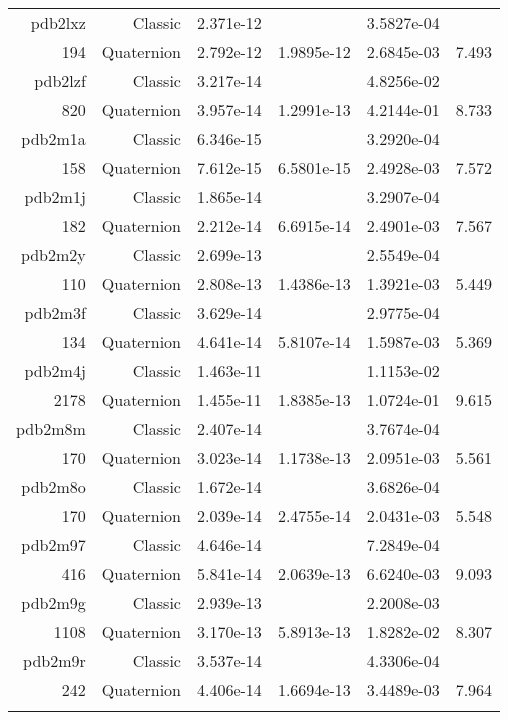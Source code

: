 \begin{xltabular}{\textwidth}{r|rS[table-format=1.3e+2]S[table-format=1.4e+2]S[table-format=1.4e+2]S[table-format=-1.3]}
pdb2lxz & Classic & 2.371e-12 &  & 3.5827e-04 & \\
194 & Quaternion & 2.792e-12 & 1.9895e-12 & 2.6845e-03 & 7.493\\  \addlinespace
pdb2lzf & Classic & 3.217e-14 &  & 4.8256e-02 & \\
820 & Quaternion & 3.957e-14 & 1.2991e-13 & 4.2144e-01 & 8.733\\  \addlinespace
pdb2m1a & Classic & 6.346e-15 &  & 3.2920e-04 & \\
158 & Quaternion & 7.612e-15 & 6.5801e-15 & 2.4928e-03 & 7.572\\  \addlinespace
pdb2m1j & Classic & 1.865e-14 &  & 3.2907e-04 & \\
182 & Quaternion & 2.212e-14 & 6.6915e-14 & 2.4901e-03 & 7.567\\  \addlinespace
pdb2m2y & Classic & 2.699e-13 &  & 2.5549e-04 & \\
110 & Quaternion & 2.808e-13 & 1.4386e-13 & 1.3921e-03 & 5.449\\  \addlinespace
pdb2m3f & Classic & 3.629e-14 &  & 2.9775e-04 & \\
134 & Quaternion & 4.641e-14 & 5.8107e-14 & 1.5987e-03 & 5.369\\  \addlinespace
pdb2m4j & Classic & 1.463e-11 &  & 1.1153e-02 & \\
2178 & Quaternion & 1.455e-11 & 1.8385e-13 & 1.0724e-01 & 9.615\\  \addlinespace
pdb2m8m & Classic & 2.407e-14 &  & 3.7674e-04 & \\
170 & Quaternion & 3.023e-14 & 1.1738e-13 & 2.0951e-03 & 5.561\\  \addlinespace
pdb2m8o & Classic & 1.672e-14 &  & 3.6826e-04 & \\
170 & Quaternion & 2.039e-14 & 2.4755e-14 & 2.0431e-03 & 5.548\\  \addlinespace
pdb2m97 & Classic & 4.646e-14 &  & 7.2849e-04 & \\
416 & Quaternion & 5.841e-14 & 2.0639e-13 & 6.6240e-03 & 9.093\\  \addlinespace
pdb2m9g & Classic & 2.939e-13 &  & 2.2008e-03 & \\
1108 & Quaternion & 3.170e-13 & 5.8913e-13 & 1.8282e-02 & 8.307\\  \addlinespace
pdb2m9r & Classic & 3.537e-14 &  & 4.3306e-04 & \\
242 & Quaternion & 4.406e-14 & 1.6694e-13 & 3.4489e-03 & 7.964\\  \addlinespace

\end{xltabular}
